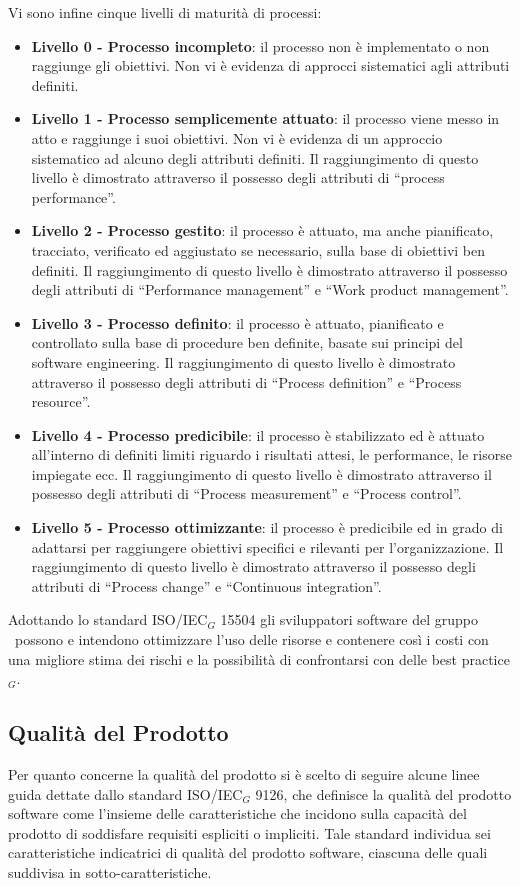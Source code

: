 \smallskip
Vi sono infine cinque livelli di maturità di processi:
\smallskip
\begin{itemize}
	\item \textbf{Livello 0 - Processo incompleto}: il processo non è implementato o non raggiunge gli obiettivi. Non vi è evidenza di approcci sistematici agli
	attributi definiti.
	\item \textbf{Livello 1 - Processo semplicemente attuato}: il processo viene messo in atto e raggiunge i suoi obiettivi. Non vi è evidenza di un approccio sistematico ad alcuno degli attributi definiti. Il raggiungimento di questo livello è dimostrato attraverso il possesso degli attributi di ``process performance''.
	\item \textbf{Livello 2 - Processo gestito}: il processo è attuato, ma anche pianificato, tracciato, verificato ed aggiustato se necessario, sulla base di obiettivi ben definiti. Il raggiungimento di questo livello è dimostrato attraverso il possesso degli attributi di ``Performance management'' e ``Work product management''.
	\item \textbf{Livello 3 - Processo definito}: il processo è attuato, pianificato e controllato sulla base di procedure ben definite, basate sui principi del software engineering. Il raggiungimento di questo livello è dimostrato attraverso il possesso degli attributi di ``Process definition'' e ``Process resource''.
	\item \textbf{Livello 4 - Processo predicibile}: il processo è stabilizzato ed è attuato all'interno di definiti limiti riguardo i risultati attesi, le performance, le	risorse impiegate ecc. Il raggiungimento di questo livello è dimostrato attraverso il possesso degli attributi di ``Process measurement'' e ``Process control''.
	\item \textbf{Livello 5 - Processo ottimizzante}: il processo è predicibile ed in grado di adattarsi per raggiungere obiettivi specifici e rilevanti per l'organizzazione. Il raggiungimento di questo livello è dimostrato attraverso il possesso degli attributi di ``Process change'' e ``Continuous integration''.
\end{itemize}
Adottando lo standard ISO/IEC$_G$ 15504 gli sviluppatori software del gruppo 	\gruppo\ possono e intendono ottimizzare l'uso delle risorse e contenere così i costi con una migliore stima dei rischi e la possibilità di confrontarsi con delle best practice$_G$.

\subsection{Qualità del Prodotto}
Per quanto concerne la qualità del prodotto si è scelto di seguire alcune linee
guida dettate dallo standard ISO/IEC$_G$ 9126, che definisce la qualità del
prodotto software come l'insieme delle caratteristiche che incidono sulla capacità del prodotto di soddisfare requisiti espliciti o impliciti. Tale standard individua sei caratteristiche indicatrici di qualità del prodotto software, ciascuna delle quali suddivisa in sotto-caratteristiche.
